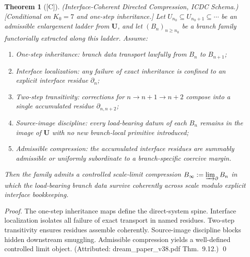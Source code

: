 \documentclass[12pt,oneside]{amsbook}
\theoremstyle{plain}
\newtheorem{theorem}{Theorem}[section]
\theoremstyle{definition}
\theoremstyle{remark}
\newcommand{\status}[1]{\textup{[#1]}}
\begin{document}
\begin{theorem}[\status{C}]\label{thm:ICDC}
\textup{(Interface-Coherent Directed Compression, ICDC Schema.)}
\textup{[Conditional on $K_0 = 7$ and one-step inheritance.]}
Let $U_{n_0} \subseteq U_{n_0+1} \subseteq \cdots$ be an admissible
enlargement ladder from $\mathbf{U}$, and let $(B_n)_{n \geq n_0}$ be
a branch family functorially extracted along this ladder.  Assume:
\begin{enumerate}[label=\textup{(\arabic*)}]
  \item \emph{One-step inheritance}: branch data transport lawfully
    from $B_n$ to $B_{n+1}$;
  \item \emph{Interface localization}: any failure of exact
    inheritance is confined to an explicit interface residue
    $\partial_n$;
  \item \emph{Two-step transitivity}: corrections for $n \to n+1
    \to n+2$ compose into a single accumulated residue $\partial_{n,n+2}$;
  \item \emph{Source-image discipline}: every load-bearing datum of
    each $B_n$ remains in the image of $\mathbf{U}$ with no new
    branch-local primitive introduced;
  \item \emph{Admissible compression}: the accumulated interface
    residues are summably admissible or uniformly subordinate to a
    branch-specific coercive margin.
\end{enumerate}
Then the family admits a controlled scale-limit compression
$B_\infty := \varinjlim_\partial B_n$ in which the load-bearing
branch data survive coherently across scale modulo explicit interface
bookkeeping.
\end{theorem}

\begin{proof}
The one-step inheritance maps define the direct-system spine.
Interface localization isolates all failure of exact transport in
named residues.  Two-step transitivity ensures residues assemble
coherently.  Source-image discipline blocks hidden downstream
smuggling.  Admissible compression yields a well-defined controlled
limit object.
(Attributed: dream\_paper\_v38.pdf Thm.~9.12.) \qed
\end{proof}
\end{document}
